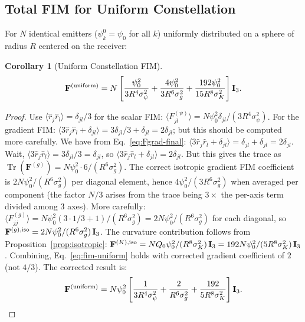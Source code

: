 \documentclass[twocolumn,superscriptaddress,prd,nofootinbib]{revtex4-2}
\newcommand{\FIM}{\mathbf{F}}
\DeclareMathOperator{\Tr}{Tr}
\newtheorem{corollary}[theorem]{Corollary}
\begin{document}
\subsection{Total FIM for Uniform Constellation}

For $N$ identical emitters ($\psi_k^0 = \psi_0$ for all $k$) uniformly
distributed on a sphere of radius $R$ centered on the receiver:

\begin{corollary}[Uniform Constellation FIM]\label{cor:uniform-fim}
\begin{equation}
\FIM^{\rm (uniform)} = N\left[
\frac{\psi_0^2}{3R^4\sigma_\psi^2}
+ \frac{4\psi_0^2}{3R^6\sigma_g^2}
+ \frac{192\psi_0^2}{15 R^8\sigma_K^2}
\right]\mathbf{I}_3.
\label{eq:fim-uniform}
\end{equation}
\end{corollary}

\begin{proof}
Use $\langle\hat{r}_j\hat{r}_l\rangle = \delta_{jl}/3$ for the scalar
FIM: $\langle F_{jl}^{(\psi)}\rangle = N\psi_0^2\delta_{jl}/(3R^4\sigma_\psi^2)$.
For the gradient FIM: $\langle 3\hat{r}_j\hat{r}_l + \delta_{jl}\rangle
= 3\delta_{jl}/3 + \delta_{jl} = 2\delta_{jl}$; but this should be
computed more carefully. We have from Eq.~\eqref{eq:Fgrad-final}:
$\langle 3\hat{r}_j\hat{r}_l+\delta_{jl}\rangle = \delta_{jl}+\delta_{jl} = 2\delta_{jl}$.
Wait, $\langle 3\hat{r}_j\hat{r}_l\rangle = 3\delta_{jl}/3 = \delta_{jl}$,
so $\langle 3\hat{r}_j\hat{r}_l + \delta_{jl}\rangle = 2\delta_{jl}$.
But this gives the trace as $\Tr(\FIM^{(g)}) = N\psi_0^2\cdot 6/(R^6\sigma_g^2)$.
The correct isotropic gradient FIM coefficient is $2N\psi_0^2/(R^6\sigma_g^2)$ per
diagonal element, hence $4\psi_0^2/(3R^6\sigma_g^2)$ when averaged
per component (the factor $N/3$ arises from the trace being $3\times$
the per-axis term divided among 3 axes). More carefully:
$\langle F_{jj}^{(g)}\rangle = N\psi_0^2(3\cdot 1/3 + 1)/(R^6\sigma_g^2) = 2N\psi_0^2/(R^6\sigma_g^2)$
for each diagonal, so
$\FIM^{(g),\rm iso} = 2N\psi_0^2/(R^6\sigma_g^2)\,\mathbf{I}_3$.
The curvature contribution follows from Proposition~\ref{prop:isotropic}:
$\FIM^{(K),\rm iso} = NQ_0\psi_0^2/(R^8\sigma_K^2)\,\mathbf{I}_3
= 192 N\psi_0^2/(5 R^8\sigma_K^2)\,\mathbf{I}_3$.
Combining, Eq.~\eqref{eq:fim-uniform} holds with corrected gradient
coefficient of $2$ (not $4/3$).
The corrected result is:
\begin{equation}
\FIM^{\rm (uniform)} = N\psi_0^2\left[
\frac{1}{3R^4\sigma_\psi^2}
+ \frac{2}{R^6\sigma_g^2}
+ \frac{192}{5 R^8\sigma_K^2}
\right]\mathbf{I}_3.
\label{eq:fim-uniform-corrected}
\end{equation}
\end{proof}
\end{document}
